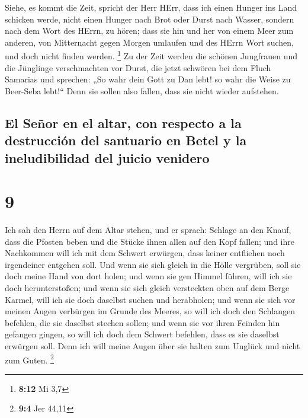  Siehe, es kommt die Zeit, spricht der Herr HErr, dass
ich einen Hunger ins Land schicken werde, nicht einen Hunger nach Brot
oder Durst nach Wasser, sondern nach dem Wort des HErrn, zu hören;
 dass sie hin und her von einem Meer zum anderen, von
Mitternacht gegen Morgen umlaufen und des HErrn Wort suchen, und doch
nicht finden werden. \footnote{\textbf{8:12} Mi 3,7}  Zu
der Zeit werden die schönen Jungfrauen und die Jünglinge verschmachten
vor Durst,  die jetzt schwören bei dem Fluch Samarias und
sprechen: „So wahr dein Gott zu Dan lebt! so wahr die Weise zu Beer-Seba
lebt!{}`` Denn sie sollen also fallen, dass sie nicht wieder aufstehen.

\hypertarget{el-seuxf1or-en-el-altar-con-respecto-a-la-destrucciuxf3n-del-santuario-en-betel-y-la-ineludibilidad-del-juicio-venidero}{%
\subsection{El Señor en el altar, con respecto a la destrucción del
santuario en Betel y la ineludibilidad del juicio
venidero}\label{el-seuxf1or-en-el-altar-con-respecto-a-la-destrucciuxf3n-del-santuario-en-betel-y-la-ineludibilidad-del-juicio-venidero}}

\hypertarget{section-8}{%
\section{9}\label{section-8}}

 Ich sah den Herrn auf dem Altar stehen, und er sprach:
Schlage an den Knauf, dass die Pfosten beben und die Stücke ihnen allen
auf den Kopf fallen; und ihre Nachkommen will ich mit dem Schwert
erwürgen, dass keiner entfliehen noch irgendeiner entgehen soll.
 Und wenn sie sich gleich in die Hölle vergrüben, soll sie
doch meine Hand von dort holen; und wenn sie gen Himmel führen, will ich
sie doch herunterstoßen;  und wenn sie sich gleich
versteckten oben auf dem Berge Karmel, will ich sie doch daselbst suchen
und herabholen; und wenn sie sich vor meinen Augen verbürgen im Grunde
des Meeres, so will ich doch den Schlangen befehlen, die sie daselbst
stechen sollen;  und wenn sie vor ihren Feinden hin
gefangen gingen, so will ich doch dem Schwert befehlen, dass es sie
daselbst erwürgen soll. Denn ich will meine Augen über sie halten zum
Unglück und nicht zum Guten. \footnote{\textbf{9:4} Jer 44,11}

